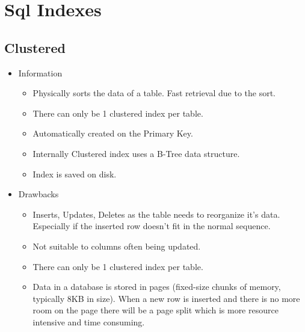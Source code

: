 \chapter*{Sql Indexes} %
\hypertarget{page1}{} %


\section*{Clustered} %
\begin{itemize}
    \item Information
    \begin{itemize}
        \item Physically sorts the data of a table. Fast retrieval due to the sort.
        \item There can only be 1 clustered index per table.
        \item Automatically created on the Primary Key.
        \item Internally Clustered index uses a B-Tree data structure.
        \item Index is saved on disk.
    \end{itemize}

    \item Drawbacks
    \begin{itemize}
        \item Inserts, Updates, Deletes as the table needs to reorganize it's data. Especially if the inserted row doesn't fit in the normal sequence. 
        \item Not suitable to columns often being updated.
        \item There can only be 1 clustered index per table.
        \item Data in a database is stored in pages (fixed-size chunks of memory, typically 8KB in size). When a new row is inserted and there is no more room on the page there will be a page split which is more resource intensive and time consuming.
    \end{itemize}
\end{itemize}

